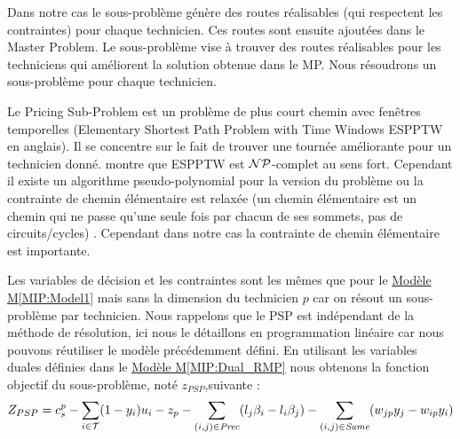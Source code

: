 Dans notre cas le sous-problème génère des routes réalisables (qui respectent les contraintes) pour chaque technicien. Ces routes sont ensuite ajoutées dans le Master Problem. 
Le sous-problème vise à trouver des routes réalisables pour les techniciens qui améliorent la solution obtenue dans le MP. Nous résoudrons un sous-problème pour chaque technicien.

Le Pricing Sub-Problem est un problème de plus court chemin avec fenêtres temporelles (Elementary Shortest Path Problem with Time Windows ESPPTW en anglais).
Il se concentre sur le fait de trouver une tournée améliorante pour un technicien donné.
\cite{Dror1994} montre que ESPPTW est $\mathcal{NP}$-complet au sens fort.
Cependant il existe un algorithme pseudo-polynomial  pour la version du problème ou la contrainte de chemin élémentaire est relaxée (un chemin élémentaire est un chemin qui ne passe qu'une seule fois par chacun de ses sommets, pas de circuits/cycles) \cite{feillet2004exact}. 
Cependant dans notre cas la contrainte de chemin élémentaire est importante.


Les variables de décision et les contraintes sont les mêmes que pour le \hyperref[MIP:Model1]{Modèle M\ref*{MIP:Model1}} mais sans la dimension du technicien $p$ car on résout un sous-problème par technicien.
Nous rappelons que le PSP est indépendant de la méthode de résolution, ici nous le détaillons en programmation linéaire car nous pouvons réutiliser le modèle précédemment défini.
En utilisant les variables duales définies dans le \hyperref[MIP:Dual_RMP]{Modèle M\ref*{MIP:Dual_RMP}} nous obtenons la fonction objectif du sous-problème, noté $z_{PSP}$,suivante : 
$$
Z_{PSP} = c^p_{s} -\sum_{i \in \mathcal{T}}(1-y_{i})u_{i} -z_{p} - \sum\limits_{(i,j)\in\textit{Prec}}(l_j\beta_i - l_i\beta_j) - \sum\limits_{(i,j)\in\textit{Same}}(w_{jp}y_{j} - w_{ip}y_{i})
$$

